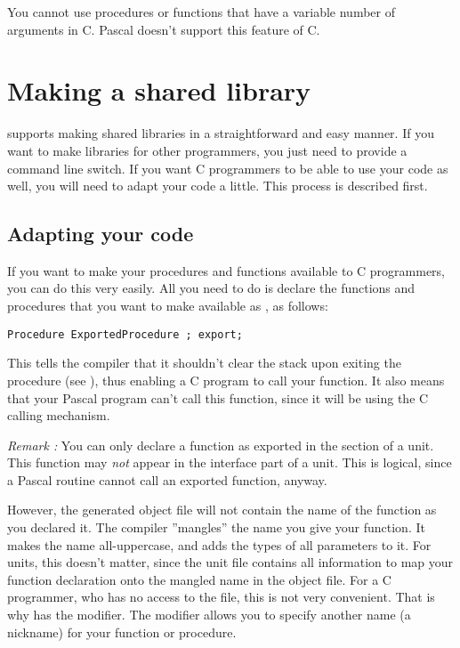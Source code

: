 \documentclass{report}
\begin{document}
You cannot use procedures or functions that have a variable number of
arguments in C. Pascal doesn't support this feature of C. 

\section{Making a shared library}
\label{se:SharedLib}

\fpc supports making shared libraries in a straightforward and easy manner.
If you want to make libraries for other \fpc programmers, you just need to 
provide a command line switch. If you want C programmers to be able to use
your code as well, you will need to adapt your code a little. This process
is described first.
 
\subsection{Adapting your code}

If you want to make your procedures and functions available to C
programmers, you can do this very easily. All you need to do is declare the
functions and procedures that you want to make available as , as
follows:
\begin{verbatim}
Procedure ExportedProcedure ; export; 
\end{verbatim}
This tells the compiler that it shouldn't clear the stack upon exiting the
procedure (see ), thus enabling a C program to call your
function. It also means that your Pascal program can't call this function,
since it will be using the C calling mechanism.

{\em Remark :} You can only declare a function as exported in the
 section of a unit. This function may {\em not} appear
in the interface part of a unit. This is logical, since a Pascal routine
cannot call an exported function, anyway.

However, the generated object file will not contain the name of the function
as you declared it. The \fpc compiler ''mangles'' the name you give your
function. It makes the name all-uppercase, and adds the types of all
parameters to it. For \fpc units, this doesn't matter, since the 
unit file contains all information to map your function declaration onto the
mangled name in the object file. For a C programmer, who has no access to
the  file, this is not very convenient. That is why \fpc
has the  modifier. The  modifier allows you to specify
another name (a nickname) for your function or procedure.
\end{document}
